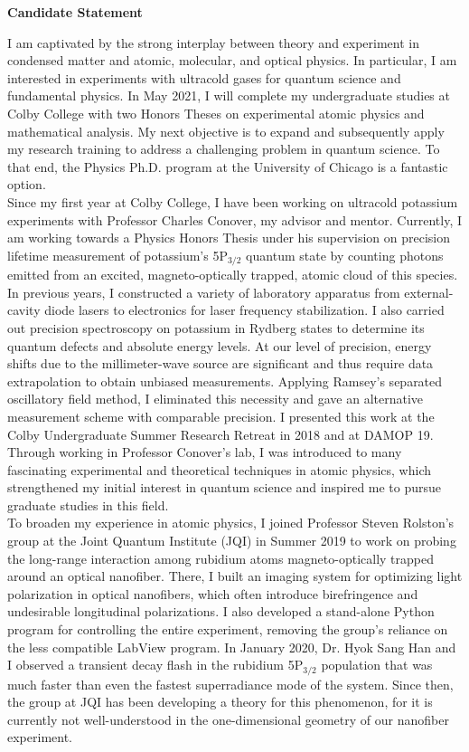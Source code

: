 \documentclass[12pt]{article}
\begin{document}
\begin{center}
	\textbf{Candidate Statement}
\end{center}
I am captivated by the strong interplay between theory and experiment in condensed matter and atomic, molecular, and optical physics. In particular, I am interested in experiments with ultracold gases for quantum science and fundamental physics. In May 2021, I will complete my undergraduate studies at Colby College with two Honors Theses on experimental atomic physics and mathematical analysis. My next objective is to expand and subsequently apply my research training to address a challenging problem in quantum science. To that end, the Physics Ph.D. program at the University of Chicago is a fantastic option.  \\ 


Since my first year at Colby College, I have been working on ultracold potassium experiments with Professor Charles Conover, my advisor and mentor. Currently, I am working towards a Physics Honors Thesis under his supervision on precision lifetime measurement of potassium's 5P$_{\text{3/2}}$ quantum state by counting photons emitted from an excited, magneto-optically trapped, atomic cloud of this species. In previous years, I constructed a variety of laboratory apparatus from external-cavity diode lasers to electronics for laser frequency stabilization. I also carried out precision spectroscopy on potassium in Rydberg states to determine its quantum defects and absolute energy levels. At our level of precision, energy shifts due to the millimeter-wave source are significant and thus require data extrapolation to obtain unbiased measurements. Applying Ramsey's separated oscillatory field method, I eliminated this necessity and gave an alternative measurement scheme with comparable precision. I presented this work at the Colby Undergraduate Summer Research Retreat in 2018 and at DAMOP 19. Through working in Professor Conover's lab, I was introduced to many fascinating experimental and theoretical techniques in atomic physics, which strengthened my initial interest in quantum science and inspired me to pursue graduate studies in this field.  \\


To broaden my experience in atomic physics, I joined Professor Steven Rolston's group at the Joint Quantum Institute (JQI) in Summer 2019 to work on probing the long-range interaction among rubidium atoms magneto-optically trapped around an optical nanofiber. There, I built an imaging system for optimizing light polarization in optical nanofibers, which often introduce birefringence and undesirable longitudinal polarizations. I also developed a stand-alone Python program for controlling the entire experiment, removing the group's reliance on the less compatible LabView program. In January 2020, Dr. Hyok Sang Han and I observed a transient decay flash in the rubidium 5P$_{\text{3/2}}$ population that was much faster than even the fastest superradiance mode of the system.  Since then, the group at JQI has been developing a theory for this phenomenon, for it is currently not well-understood in the one-dimensional geometry of our nanofiber experiment. \\ 
\end{document}
